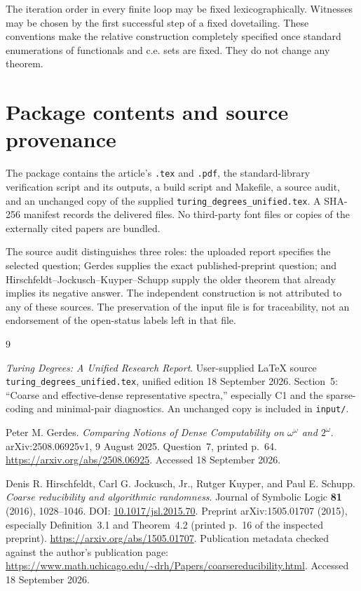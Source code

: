 \documentclass[11pt,a4paper]{article}
\newcommand{\code}[1]{\texttt{#1}}
\theoremstyle{definition}\newtheorem{definition}[theorem]{Definition}
\theoremstyle{remark}\newtheorem{remark}[theorem]{Remark}
\begin{document}
The iteration order in every finite loop may be fixed lexicographically.
Witnesses may be chosen by the first successful step of a fixed dovetailing.
These conventions make the relative construction completely specified once
standard enumerations of functionals and c.e. sets are fixed. They do not
change any theorem.

\section{Package contents and source provenance}

The package contains the article's \code{.tex} and \code{.pdf}, the
standard-library verification script and its outputs, a build script and
Makefile, a source audit, and an unchanged copy of the supplied
\code{turing\_degrees\_unified.tex}. A SHA-256 manifest records the delivered
files. No third-party font files or copies of the externally cited papers
are bundled.

The source audit distinguishes three roles: the uploaded report specifies
the selected question; Gerdes supplies the exact published-preprint question;
and Hirschfeldt--Jockusch--Kuyper--Schupp supply the older theorem that already
implies its negative answer. The independent construction is not attributed
to any of these sources. The preservation of the input file is for
traceability, not an endorsement of the open-status labels left in that file.

\begin{thebibliography}{9}
\raggedright

\emph{Turing Degrees: A Unified Research Report}.
User-supplied LaTeX source \code{turing\_degrees\_unified.tex}, unified edition
18 September 2026. Section~5: ``Coarse and effective-dense representative
spectra,'' especially C1 and the sparse-coding and minimal-pair diagnostics.
An unchanged copy is included in \code{input/}.

Peter M. Gerdes.
\emph{Comparing Notions of Dense Computability on $\omega^\omega$ and $2^\omega$}.
arXiv:2508.06925v1, 9 August 2025.
Question~7, printed p.~64.
\url{https://arxiv.org/abs/2508.06925}.
Accessed 18 September 2026.

Denis R. Hirschfeldt, Carl G. Jockusch, Jr., Rutger Kuyper, and Paul E. Schupp.
\emph{Coarse reducibility and algorithmic randomness}.
Journal of Symbolic Logic \textbf{81} (2016), 1028--1046.
DOI: \href{https://doi.org/10.1017/jsl.2015.70}{10.1017/jsl.2015.70}.
Preprint arXiv:1505.01707 (2015), especially Definition~3.1 and Theorem~4.2
(printed p.~16 of the inspected preprint).
\url{https://arxiv.org/abs/1505.01707}.
Publication metadata checked against the author's publication page:
\url{https://www.math.uchicago.edu/~drh/Papers/coarsereducibility.html}.
Accessed 18 September 2026.

\end{thebibliography}
\end{document}
